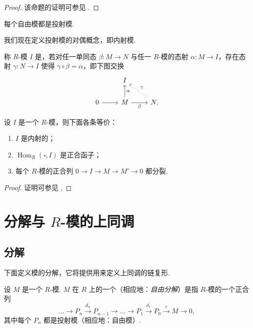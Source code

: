\begin{proof}
该命题的证明可参见 \cite[Theorem~3.1, Chapter~3]{rot09}.
\end{proof}

\begin{corollary}\label{c4-cor-2-3}
每个自由模都是投射模.
\end{corollary}

我们现在定义投射模的对偶概念，即内射模.

\begin{definition}\label{c4-def-2-3}
称 $R$-模 $I$ 是，若对任一单同态 $\beta:M\to N$ 与任一 $R$-模的态射 $\alpha:M\to I$，存在态射 $\gamma:N\to I$ 使得 $\gamma\circ\beta=\alpha$，即下图交换
\[
\begin{tikzcd}
& I \\
0 \arrow[r] & M \arrow[u,"\alpha"'] \arrow[r,"\beta"'] & N. \arrow[ul,dotted,"\gamma"']
\end{tikzcd}
\]
\end{definition}

\begin{theorem}\label{c4-thm-2-4}
设 $I$ 是一个 $R$-模，则下面各条等价：
\begin{enumerate}[label=(\arabic*),leftmargin=*]
    \item $I$ 是内射的；
    \item $\operatorname{Hom}_R(\square, I)$ 是正合函子；
    \item 每个 $R$-模的正合列 $0\to I\to M\to M'\to 0$ 都分裂.
\end{enumerate}
\end{theorem}

\begin{proof}
证明可参见 \cite[Proposition~3.25 \& 3.26, \S3.2]{rot09}.
\end{proof}

\section{\texorpdfstring{分解与 $R$-模的上同调}{分解与 R-模的上同调}}

\subsection{分解}

下面定义模的分解，它将提供用来定义上同调的链复形.

\begin{definition}\label{c4-def-3-1}
设 $M$ 是一个 $R$-模. $M$ 在 $R$ 上的一个（相应地：\emph{自由分解}）是指 $R$-模的一个正合列
\[
\ldots\to P_n\xrightarrow{d_n}P_{n-1}\to\ldots\to P_1\xrightarrow{d_1}P_0\xrightarrow{\varepsilon}M\to 0,
\]
其中每个 $P_n$ 都是投射模（相应地：自由模）.
\end{definition}

